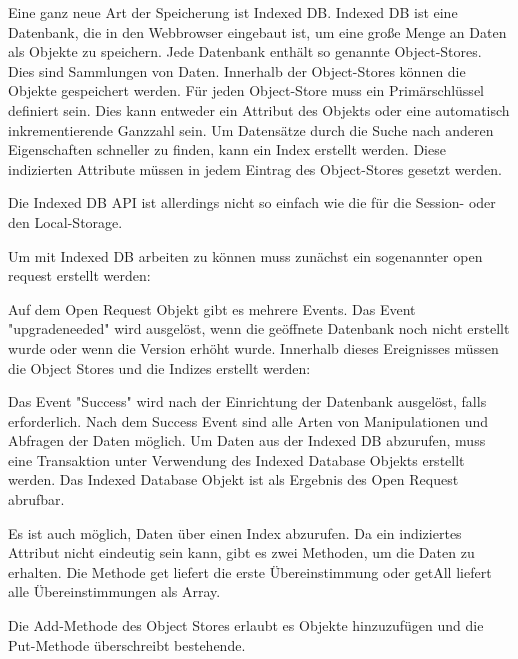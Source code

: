 
Eine ganz neue Art der Speicherung ist Indexed DB. Indexed DB ist eine Datenbank, die in den Webbrowser eingebaut ist, um eine große Menge an Daten als Objekte zu speichern. Jede Datenbank enthält so genannte Object-Stores. Dies sind Sammlungen von Daten. Innerhalb der Object-Stores können die Objekte gespeichert werden. Für jeden Object-Store muss ein Primärschlüssel definiert sein. Dies kann entweder ein Attribut des Objekts oder eine automatisch inkrementierende Ganzzahl sein. Um Datensätze durch die Suche nach anderen Eigenschaften schneller zu finden, kann ein Index erstellt werden. Diese indizierten Attribute müssen in jedem Eintrag des Object-Stores gesetzt werden.

Die Indexed DB API ist allerdings nicht so einfach wie die für die Session- oder den Local-Storage. 

Um mit Indexed DB arbeiten zu können muss zunächst ein sogenannter open request erstellt werden:


Auf dem Open Request Objekt gibt es mehrere Events. Das Event "upgradeneeded" wird ausgelöst, wenn die geöffnete Datenbank noch nicht erstellt wurde oder wenn die Version erhöht wurde. Innerhalb dieses Ereignisses müssen die Object Stores und die Indizes erstellt werden: 


Das Event "Success" wird nach der Einrichtung der Datenbank ausgelöst, falls erforderlich. Nach dem Success Event sind alle Arten von Manipulationen und Abfragen der Daten möglich. Um Daten aus der Indexed DB abzurufen, muss eine Transaktion unter Verwendung des Indexed Database Objekts erstellt werden. Das Indexed Database Objekt ist als Ergebnis des Open Request abrufbar.


Es ist auch möglich, Daten über einen Index abzurufen. Da ein indiziertes Attribut nicht eindeutig sein kann, gibt es zwei Methoden, um die Daten zu erhalten. Die Methode get liefert die erste Übereinstimmung oder getAll liefert alle Übereinstimmungen als Array.


Die Add-Methode des Object Stores erlaubt es Objekte hinzuzufügen und die Put-Methode überschreibt bestehende.

\cite{MDNIndexedDB}
\cite{MDNUsingIndexedDB}